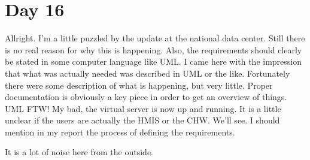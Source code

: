 \section{Day 16}
Allright. I'm a little puzzled by the update at the national data center.
Still there is no real reason for why this is happening.
Also, the requirements should clearly be stated in some computer language like UML.
I came here with the impression that what was actually needed was described in UML or the like.
Fortunately there were some description of what is happening, but very little.
Proper documentation is obviously a key piece in order to get an overview of things.
UML FTW!
My bad, the virtual server is now up and running.
It is a little unclear if the users are actually the HMIS or the CHW. 
We'll see.
I should mention in my report the process of defining the requirements.

It is a lot of noise here from the outside.

